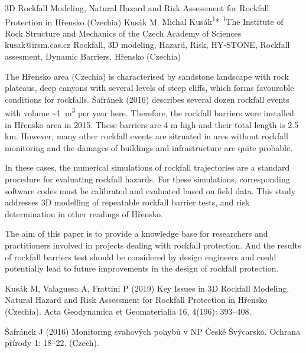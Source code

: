 \abstract
{3D Rockfall Modeling, Natural Hazard and Risk Assessment for Rockfall Protection in Hřensko (Czechia)} 
{Kusák M.} 
{Michal Kusák\textsuperscript{1}*} 
{\POtag} 
{
	\textsuperscript{1}The Institute of Rock Structure and Mechanics of the Czech Academy of Sciences
}
{kusak@irsm.cas.cz}  %
{Rockfall, 3D modeling, Hazard, Risk, HY-STONE, Rockfall assesment, Dynamic Barriers, Hřensko (Czechia)}
{The Hřensko area (Czechia) is characterised by sandstone landscape with rock plateaus, deep canyons with several levels of steep cliffs, which forms favourable conditions for rockfalls. Šafránek (2016) describes several dozen rockfall events with volume \textasciitilde1~m\textsuperscript{3} per year here. Therefore, the rockfall barriers were installed in Hřensko area in 2015. These barriers are 4 m high and their total length is 2.5 km. However, many other rockfall events are sitruated in ares without rockfall monitoring and the damages of buildings and infrastructure are quite probable. 

In these cases, the numerical simulations of rockfall trajectories are a standard procedure for evaluating rockfall hazards. For these simulations, corresponding software codes must be calibrated and evaluated based on field data. This study addresses 3D modelling of repeatable rockfall barrier tests, and risk determination in other readings of Hřensko.

The aim of this paper is to provide a knowledge base for researchers and practitioners involved in projects dealing with rockfall protection. And the results of rockfall barriers test should be considered by design engineers and could potentially lead to future improvements in the design of rockfall protection.
}
{Kusák M, Valagussa A, Frattini P (2019) Key Issues in 3D Rockfall Modeling, Natural Hazard and Risk Assessment for Rockfall Protection in Hřensko (Czechia). Acta Geodynamica et Geomaterialia 16, 4(196): 393–408.

Šafránek J (2016) Monitoring svahových pohybů v NP České Švýcarsko. Ochrana přírody 1: 18–22. (Czech).
}




















